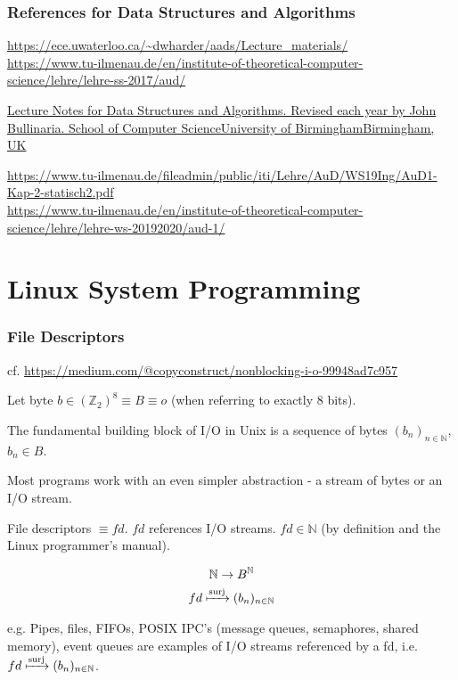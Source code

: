 \documentclass[10pt]{amsart}
\begin{document}
\begin{multicols*}{2}
\section{References for Data Structures and Algorithms}

\url{https://ece.uwaterloo.ca/~dwharder/aads/Lecture_materials/} \\
\url{https://www.tu-ilmenau.de/en/institute-of-theoretical-computer-science/lehre/lehre-ss-2017/aud/}

\href{https://www.cs.bham.ac.uk/~jxb/DSA/dsa.pdf}{Lecture Notes for Data Structures and Algorithms. Revised each year by John Bullinaria. School of Computer ScienceUniversity of BirminghamBirmingham, UK}

\url{https://www.tu-ilmenau.de/fileadmin/public/iti/Lehre/AuD/WS19Ing/AuD1-Kap-2-statisch2.pdf} \\
\url{https://www.tu-ilmenau.de/en/institute-of-theoretical-computer-science/lehre/lehre-ws-20192020/aud-1/} \\


\part{Linux System Programming}

\section{File Descriptors}

cf. \url{https://medium.com/@copyconstruct/nonblocking-i-o-99948ad7c957}

Let byte $b \in (\mathbb{Z}_2)^8 \equiv B \equiv o$ (when referring to exactly 8 bits).

The fundamental building block of I/O in Unix is a sequence of bytes $(b_n)_{n\in \mathbb{N}}$, $b_n \in B$. 

Most programs work with an even simpler abstraction - a stream of bytes or an I/O stream.

File descriptors $\equiv fd$. $fd$ references I/O streams.  $fd \in \mathbb{N}$ (by definition and the Linux programmer's manual).

\[
\begin{gathered}
\mathbb{N} \to B^{\mathbb{N}} \\
fd \xmapsto{\text{surj}} (b_n)_{n \in \mathbb{N}}
\end{gathered}
\]

e.g. Pipes, files, FIFOs, POSIX IPC's (message queues, semaphores, shared memory), event queues are examples of I/O streams referenced by a fd, i.e. $fd \xmapsto{\text{surj}} (b_n)_{n \in \mathbb{N}}$.


\end{multicols*}
\end{document}
